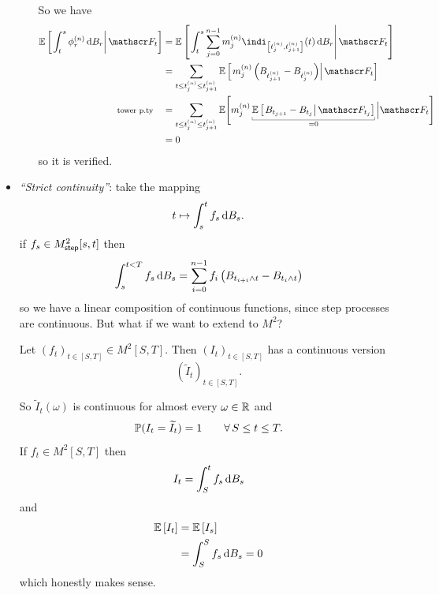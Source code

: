 \documentclass[12pt]{report}
\begin{document}
\begin{itemize}
\begin{fancyproof}
\begin{enumerate}[\circnum]
\begin{equation*}
			\end{equation*}
			So we have
			\begin{align*}
				\ev{\left.\int_{t}^{s}\phi^{(n)}_{r}\dif B_{r}\right|\F_{t}}&=\ev{\left.\int_{t}^{s}\sum_{j=0}^{n-1}m_{j}^{(n)}\indi_{\left[t^{(n)}_{j},t^{(n)}_{j+1}\right]}(t)\dif B_{r}\right|\F_{t}}\\
				&=\sum_{t\leq t_{j}^{(n)}\leq t^{(n)}_{j+1}}\ev{\left.m^{(n)}_{j}\left(B_{t^{(n)}_{j+1}}-B_{t^{(n)}_{j}}\right)\right|\F_{t}}\\
				\text{\footnotesize tower p.ty}\quad&=\sum_{t\leq t^{(n)}_{j}\leq t^{(n)}_{j+1}}\evs\Biggl[m_{j}^{(n)}\ubracketthin{\ev{\left.B_{t_{j+1}}-B_{t_{j}}\right|\F_{t_{j}}}}_{=0}\Big|\F_{t}\Biggr]\\
				&=0
			\end{align*}
			so it is verified. \hfill\faCheckCircle[regular]
		\end{enumerate}
	\end{fancyproof}
	\item \emph{``Strict continuity''}: take the mapping
	\begin{equation*}
		t\mapsto\int_{s}^{t}f_{s}\mathop{}\!\mathrm{d} B_{s}.
	\end{equation*}
	if $f_{s}\in M^{2}_{\mathsf{step}}[s,t]$ then
	\begin{equation*}
		\int_{s}^{t<T}f_{s}\mathop{}\!\mathrm{d} B_{s}=\sum_{i=0}^{n-1}f_{i}\left(B_{t_{i+i}\wedge t}-B_{t_{i}\wedge t}\right)
	\end{equation*}
	so we have a linear composition of continuous functions, since step processes are continuous. But what if we want to extend to $M^{2}$?
	\begin{theorem}
		Let ${\left(f_{t}\right)}_{t\in[S,T]}\in M^{2}[S,T]$. Then ${(I_{t})}_{t\in[S,T]}$ has a continuous version
		\begin{equation*}
			{\left(\widetilde{I}_{t}\right)}_{t\in[S,T]}.
		\end{equation*}
	\end{theorem}
	So $\widetilde{I}_{t}(\omega)$ is continuous for almost every $\omega\in\mathbb{R}$ and
	\begin{equation*}
		\mathbb{P}(I_{t}=\widetilde{I}_{t})=1\qquad\forall\, S\leq t\leq T.
	\end{equation*}
	If $f_{t}\in M^{2}[S,T]$ then
	\begin{equation*}
		I_{t}=\int_{S}^{t}f_{s}\mathop{}\!\mathrm{d} B_{s}
	\end{equation*}
	and
	\begin{align*}
		\mathbb{E}\left[I_{t}\right]&=\mathbb{E}\left[I_{s}\right]\\
		&=\int_{S}^{S}f_{s}\mathop{}\!\mathrm{d} B_{s}=0
	\end{align*}
	which honestly makes sense.
\end{itemize}
\end{document}
